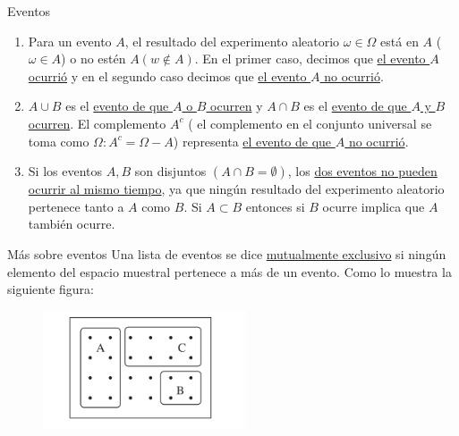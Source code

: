 \documentclass{beamer}
\begin{document}
\begin{frame}{Eventos  }
\begin{enumerate}
\item Para un evento $A$, el resultado del experimento aleatorio $ \omega \in \Omega $ est\'a en $A$ ($\omega \in A$) o   no est\' en  $A (w \notin A)$. En el primer caso, decimos que \underline{ el evento $A$ ocurri\'o}  y en el segundo caso decimos que \underline{el evento $A$ no ocurri\'o}.

\item $A \cup B$ es el \underline{evento de que $A$ o $B$ ocurren} y $A \cap B$ es el \underline{evento de que $A$ y $B$ ocurren}. El complemento $A^c$ ( el complemento en el conjunto universal se toma como $\Omega: A^c = \Omega -A$) representa \underline{el evento de que $A$ no ocurri\'o}. 

\item Si los eventos $A, B$ son disjuntos $(A \cap B = \emptyset)$, los \underline{dos eventos no pueden ocurrir al mismo tiempo}, ya que ning\'un resultado del experimento aleatorio pertenece tanto a $A$ como $B$. Si $A \subset B$ entonces si  $B$ ocurre implica que $A$ tambi\'en ocurre.
\end{enumerate}
\end{frame}

\begin{frame}{M\'as sobre eventos}
 Una lista de eventos se dice \underline{mutualmente exclusivo} si ning\'un elemento del espacio muestral pertenece a m\'as de un evento. Como lo muestra la siguiente figura:
 
 \vspace{0.2cm}
 
 \begin{figure}[!htb]
 	\centering
 	\includegraphics[width=6cm]{p3}
 \end{figure}

\end{frame}
\end{document}
